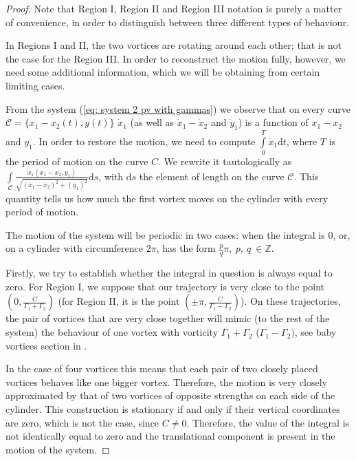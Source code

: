 \documentclass[11pt,twoside]{article}
\theoremstyle{definition}
\numberwithin{equation}{section}
\begin{document}
\begin{proof}
Note that Region I, Region II and Region III notation is purely a matter of convenience, in order to distinguish between three different types of behaviour. 


In Regions I and II, the two vortices are rotating around each other; that is not the case for the Region III. In order to reconstruct the motion fully, however, we need some additional information, which we will be obtaining from certain limiting cases. 

 From the system (\ref{eq: system 2 pv with gammas}) we observe that on every curve $\mathcal{C} = \{x_1-x_2(t),y(t)\}$ $\dot{x}_1$ (as well as $\dot{x}_1 - \dot{x}_2$ and $\dot{y}_1$) is a function of $x_1-x_2$ and $y_1$. In order to restore the motion,  we need to compute $ \int\limits_0^{T} \dot{x}_1\mathrm{d}t$, where $T$ is the period of motion on the curve $C$.  We rewrite it tautologically as $   \int\limits_{\mathcal{C}} \frac{\dot{x}_1(x_1-x_2,y_1)}{\sqrt{(\dot{x}_1-\dot{x}_2)^2+(\dot{y}_1)^2}}\mathrm{d}s$, with $\mathrm{d}s$ the element of length on the curve $\mathcal{C}$. This quantity tells us how much the first vortex moves on the cylinder with every period of motion.
 
 The motion of the system will be periodic in two cases: when the integral is 0, or, on a cylinder with circumference $2\pi$, has the form $\frac{p}{q}\pi,\  p,\ q\ \in\mathbb{Z}$.
 
  Firstly, we try to establish whether the integral in question is always equal to zero. For Region I, we suppose that our trajectory is very close to the point $\left(0, \frac{C}{\Gamma_1 + \Gamma_2}\right)$ (for Region II, it is the point $\left(\pm\pi,\frac{C}{\Gamma_1-\Gamma_2}\right)$). On these trajectories, the pair of vortices that are very close together will mimic (to the rest of the system) the behaviour of one vortex with vorticity $\Gamma_1 + \Gamma_2$ ($\Gamma_1 - \Gamma_2)$, see baby vortices section in \cite{montaldi2003vortex}.
  
  In the case of four vortices this means that each pair of two closely placed vortices behaves like one bigger vortex. Therefore, the motion is very closely approximated by that of two vortices of opposite strengths on  each side of the cylinder. This construction is stationary if and only if their vertical coordinates are zero, which is not the case, since $C\ne 0$.  Therefore, the value of the integral is not identically equal to zero and the translational component is present in the motion of the system. 
    

\end{proof}
\end{document}
